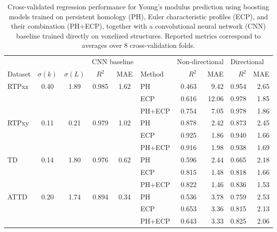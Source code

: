 \documentclass[sn-mathphys,Numbered]{sn-jnl}
\theoremstyle{definition}
\begin{document}
\begin{table}[]
\centering
\caption{Cross-validated regression performance for Young’s modulus prediction using boosting models trained on persistent homology (PH), Euler characteristic profiles (ECP), and their combination (PH+ECP), together with a convolutional neural network (CNN) baseline trained directly on voxelized structures. Reported metrics correspond to averages over 8 cross-validation folds.}
\label{tab:metrics}
\begin{tabular}{lcc|cc||l|rrrr}
\hline 
 & \multicolumn{2}{l}{} & \multicolumn{2}{|l||}{CNN baseline} &  & \multicolumn{2}{l}{Non-directional} & \multicolumn{2}{l}{Directional} \\
Dataset & $\sigma(k)$ & $\sigma(L)$ & $R^2$ & MAE & Method & $R^2$ & MAE & $R^2$ & MAE \\ \hline
RTPxz & 0.40 & 1.89 & 0.985 & 1.62 & PH & 0.463 & 9.42 & 0.954 & 2.65 \\
 &  &  &  &  & ECP & 0.616 & 12.06 & 0.978 & 1.85 \\
 &  &  &  &  & PH+ECP & 0.754 & 7.05 & 0.978 & 1.86 \\ \hline
RTPxy & 0.11 & 0.21 & 0.979 & 1.02 & PH & 0.878 & 2.42 & 0.873 & 2.45 \\
 &  &  &  &  & ECP & 0.925 & 1.86 & 0.940 & 1.66 \\
 &  &  &  &  & PH+ECP & 0.916 & 1.98 & 0.938 & 1.69 \\ \hline
TD & 0.14 & 1.80& 0.976 & 0.62 & PH & 0.596 & 2.44 & 0.665 & 2.18 \\
 &  &  &  &  & ECP & 0.815 & 1.48 & 0.818 & 1.66 \\
 &  &  &  &  & PH+ECP & 0.822 & 1.46 & 0.836 & 1.53 \\ \hline
ATTD & 0.20 & 1.74 & 0.894 & 0.34 & PH & 0.536 & 3.78 & 0.759 & 2.53 \\
 &  &  &  &  & ECP & 0.653 & 3.36 & 0.815 & 2.13 \\
 &  &  &  &  & PH+ECP & 0.643 & 3.33 & 0.825 & 2.06 \\ \hline
\end{tabular}
\end{table}
\end{document}
